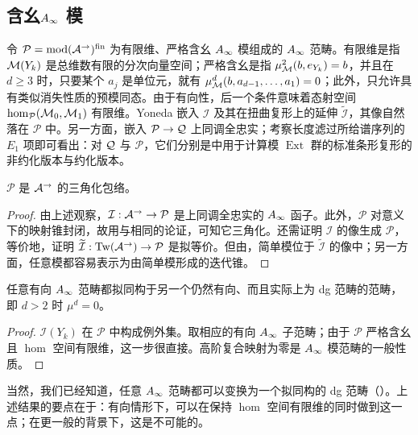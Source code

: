 \subsection{含幺\texorpdfstring{$A_\infty$}{A∞} 模}\label{sec:5p}
令 $\mathcal P=\operatorname{mod}(\mathcal A^{\to})^{\mathrm{fin}}$ 为有限维、严格含幺 $A_\infty$ 模组成的 $A_\infty$ 范畴。有限维是指 $\mathcal M(Y_k)$ 是总维数有限的分次向量空间；严格含幺是指 $\mu^2_{\mathcal M}(b,e_{Y_k})=b$，并且在 $d\geq3$ 时，只要某个 $a_j$ 是单位元，就有 $\mu^d_{\mathcal M}(b,a_{d-1},\ldots,a_1)=0$；此外，只允许具有类似消失性质的预模同态。由于有向性，后一个条件意味着态射空间 $\hom_{\mathcal P}(\mathcal M_0,\mathcal M_1)$ 有限维。Yoneda 嵌入 $\mathcal I$ 及其在扭曲复形上的延伸 $\widetilde{\mathcal I}$，其像自然落在 $\mathcal P$ 中。另一方面，嵌入 $\mathcal P\to\mathcal Q$ 上同调全忠实；考察长度滤过所给谱序列的 $E_1$ 项即可看出：对 $\mathcal Q$ 与 $\mathcal P$，它们分别是中用于计算模 $\operatorname{Ext}$ 群的标准条形复形的非约化版本与约化版本。
\begin{corollary}\label{st:5.26}
$\mathcal P$ 是 $\mathcal A^{\to}$ 的三角化包络。
\end{corollary}
\begin{proof}
由上述观察，$\mathcal I:\mathcal A^{\to}\to\mathcal P$ 是上同调全忠实的 $A_\infty$ 函子。此外，$\mathcal P$ 对意义下的映射锥封闭，故用与相同的论证，可知它三角化。还需证明 $\mathcal I$ 的像生成 $\mathcal P$，等价地，证明 $\widetilde{\mathcal I}:\operatorname{Tw}(\mathcal A^{\to})\to\mathcal P$ 是拟等价。但由，简单模位于 $\widetilde{\mathcal I}$ 的像中；另一方面，任意模都容易表示为由简单模形成的迭代锥。
\end{proof}
\begin{corollary}\label{st:5.27}
任意有向 $A_\infty$ 范畴都拟同构于另一个仍然有向、而且实际上为 dg 范畴的范畴，即 $d>2$ 时 $\mu^d=0$。
\end{corollary}
\begin{proof}
$\mathcal I(Y_k)$ 在 $\mathcal P$ 中构成例外集。取相应的有向 $A_\infty$ 子范畴；由于 $\mathcal P$ 严格含幺且 $\hom$ 空间有限维，这一步很直接。高阶复合映射为零是 $A_\infty$ 模范畴的一般性质。
\end{proof}
当然，我们已经知道，任意 $A_\infty$ 范畴都可以变换为一个拟同构的 dg 范畴（）。上述结果的要点在于：有向情形下，可以在保持 $\hom$ 空间有限维的同时做到这一点；在更一般的背景下，这是不可能的。

